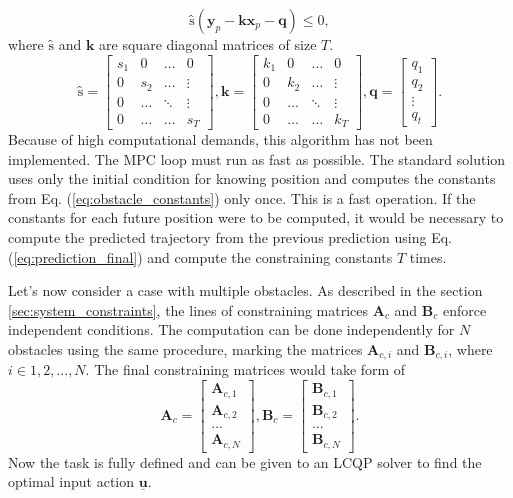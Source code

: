 \documentclass[a4paper,11pt,titlepage]{article}
\begin{document}
\begin{equation}
\label{eq:matrix_obstacle_cond}
\textbf{\^s}(\textbf{y}_p - \textbf{\^k}\textbf{x}_p - \textbf{q}) \leq 0,
\end{equation}
where $\textbf{\^s}$ and $\textbf{\^k}$ are square diagonal matrices of size $T$.
\begin{equation}
\label{eq:obstacle_constants_matrices}
\textbf{\^s} = \begin{bmatrix}
s_1 & 0 & \hdots & 0 \\
0 & s_2 & \hdots & \vdots \\
0 & \hdots & \ddots & \vdots \\
0 & \hdots & \hdots & s_T
\end{bmatrix},
\textbf{\^k} = \begin{bmatrix}
k_1 & 0 & \hdots & 0 \\
0 & k_2 & \hdots & \vdots \\
0 & \hdots & \ddots & \vdots \\
0 & \hdots & \hdots & k_T
\end{bmatrix},
\textbf{q} = \begin{bmatrix}
q_1 \\
q_2 \\
\vdots \\
q_t
\end{bmatrix}.
\end{equation}
Because of high computational demands, this algorithm has not been implemented. The MPC loop must run as fast as possible. The standard solution uses only the initial condition for knowing position and computes the constants from Eq. (\ref{eq:obstacle_constants}) only once. This is a fast operation. If the constants for each future position were to be computed, it would be necessary to compute the predicted trajectory from the previous prediction using Eq. (\ref{eq:prediction_final}) and compute the constraining constants $T$ times.

Let's now consider a case with multiple obstacles. As described in the section \ref{sec:system_constraints}, the lines of constraining matrices $\textbf{A}_c$ and $\textbf{B}_c$  enforce independent conditions. The computation can be done independently for $N$ obstacles using the same procedure, marking the matrices $\textbf{A}_{c,i}$ and $\textbf{B}_{c,i}$, where $i \in {1, 2, ..., N}$. The final constraining matrices would take form of
\begin{equation}
\textbf{A}_c =
  \begin{bmatrix}
  \textbf{A}_{c,1} \\
  \textbf{A}_{c,2} \\
  ...	   \\
  \textbf{A}_{c,N}
  \end{bmatrix},\textbf{B}_c = \begin{bmatrix}
  \textbf{B}_{c,1} \\
  \textbf{B}_{c,2} \\
  ...	   \\
  \textbf{B}_{c,N}
  \end{bmatrix}.
\end{equation}
Now the task is fully defined and can be given to an LCQP solver to find the optimal input action $\underline{\textbf{u}}$. 
\end{document}
